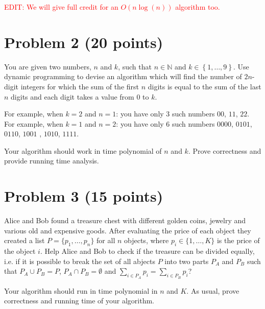 \documentclass[letterpaper, 11pt]{article}
\begin{document}
\textcolor{red}{EDIT: We will give full credit for an $O(n\log(n))$ algorithm too.}






\section{Problem 2 (20 points)}
You are given two numbers, $n$ and $k$, such that $n\in \mathbb{N}$ and $k\in \left\{1,\dots,9 \right\}$. Use dynamic programming to devise an algorithm which will find the number of $2n$-digit integers for which the sum of the first $n$ digits is equal to the sum of the last $n$ digits and each digit takes a value from $0$ to $k$.

For example, when $k = 2$ and $n = 1$: you have only $3$ such numbers $00$, $11$, $22$. 
For example, when $k = 1$ and $n = 2$: you have only $6$ such numbers $0000$, $0101$, $0110$, $1001$ , $1010$, $1111$.		

Your algorithm should work in time polynomial of $n$ and $k$. Prove correctness and provide running time analysis.







\section{Problem 3 (15 points)}

Alice and Bob found a treasure chest with different golden coins, jewelry and various old and expensive goods.
After evaluating the price of each object they created a list $P = \{p_1,\ldots,p_n\}$ for all $n$ objects, where $p_i \in \{1,\ldots, K\}$
is the price of the object $i$. Help Alice and Bob to check if the treasure can be divided  equally,
i.e. if it is possible to  break the set of all abjects $P$
into two parts $P_A$ and $P_B$ such that  $P_A \cup P_B = P$, $P_A \cap P_B = \emptyset$ and $\sum_{i\in P_A}{p_i} =  \sum_{i \in P_B}{p_i}$?

Your algorithm should run in time polynomial in $n$ and $K$. As usual, prove correctness and running time of your algorithm.


\end{document}
